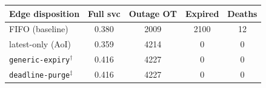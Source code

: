 \begin{tabular}{lcccc}
\toprule
Edge disposition & Full svc & Outage OT & Expired & Deaths\\
\midrule
FIFO (baseline) & 0.380 & 2009 & 2100 & 12\\
latest-only (AoI) & 0.359 & 4214 & 0 & 0\\
\texttt{generic-expiry}$^{\dagger}$ & 0.416 & 4227 & 0 & 0\\
\texttt{deadline-purge}$^{\ddagger}$ & 0.416 & 4227 & 0 & 0\\
\bottomrule
\end{tabular}

